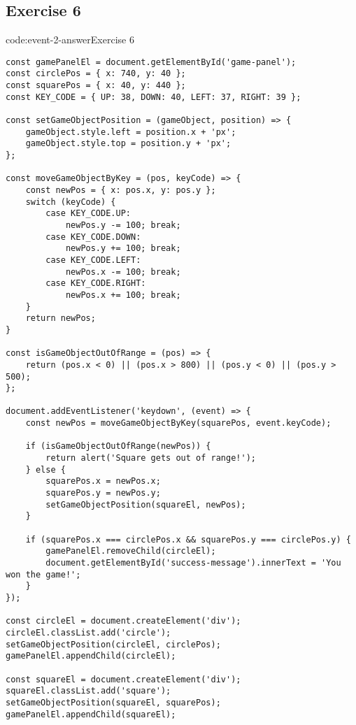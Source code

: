 \subsection*{Exercise 6}

\begin{codeenv}{code:event-2-answer}{Exercise 6}\begin{verbatim}
const gamePanelEl = document.getElementById('game-panel');
const circlePos = { x: 740, y: 40 };
const squarePos = { x: 40, y: 440 };
const KEY_CODE = { UP: 38, DOWN: 40, LEFT: 37, RIGHT: 39 };

const setGameObjectPosition = (gameObject, position) => {
    gameObject.style.left = position.x + 'px';
    gameObject.style.top = position.y + 'px';
};

const moveGameObjectByKey = (pos, keyCode) => {
    const newPos = { x: pos.x, y: pos.y };
    switch (keyCode) {
        case KEY_CODE.UP:
            newPos.y -= 100; break;
        case KEY_CODE.DOWN:
            newPos.y += 100; break;
        case KEY_CODE.LEFT:
            newPos.x -= 100; break;
        case KEY_CODE.RIGHT:
            newPos.x += 100; break;
    }
    return newPos;
}

const isGameObjectOutOfRange = (pos) => {
    return (pos.x < 0) || (pos.x > 800) || (pos.y < 0) || (pos.y > 500);
};

document.addEventListener('keydown', (event) => {
    const newPos = moveGameObjectByKey(squarePos, event.keyCode);

    if (isGameObjectOutOfRange(newPos)) {
        return alert('Square gets out of range!');
    } else {
        squarePos.x = newPos.x;
        squarePos.y = newPos.y;
        setGameObjectPosition(squareEl, newPos);
    }

    if (squarePos.x === circlePos.x && squarePos.y === circlePos.y) {
        gamePanelEl.removeChild(circleEl);
        document.getElementById('success-message').innerText = 'You won the game!';
    }
});

const circleEl = document.createElement('div');
circleEl.classList.add('circle');
setGameObjectPosition(circleEl, circlePos);
gamePanelEl.appendChild(circleEl);

const squareEl = document.createElement('div');
squareEl.classList.add('square');
setGameObjectPosition(squareEl, squarePos);
gamePanelEl.appendChild(squareEl);
\end{verbatim}
\end{codeenv}

